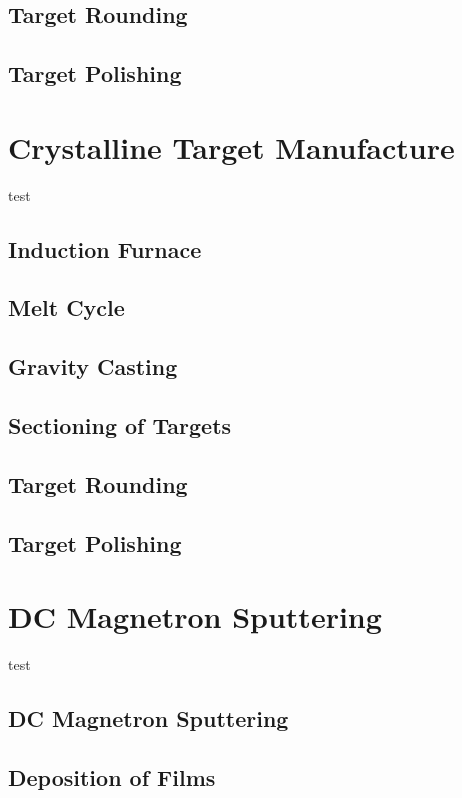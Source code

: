 \documentclass[a4paper,12pt,oneside]{report}%
\begin{document}
\subsection{Target Rounding}

\subsection{Target Polishing}

\section{Crystalline Target Manufacture}
test
\subsection{Induction Furnace}

\subsection{Melt Cycle}

\subsection{Gravity Casting}

\subsection{Sectioning of Targets}

\subsection{Target Rounding}

\subsection{Target Polishing}

\section{DC Magnetron Sputtering}
test
\subsection{DC Magnetron Sputtering}

\subsection{Deposition of Films}
\end{document}
